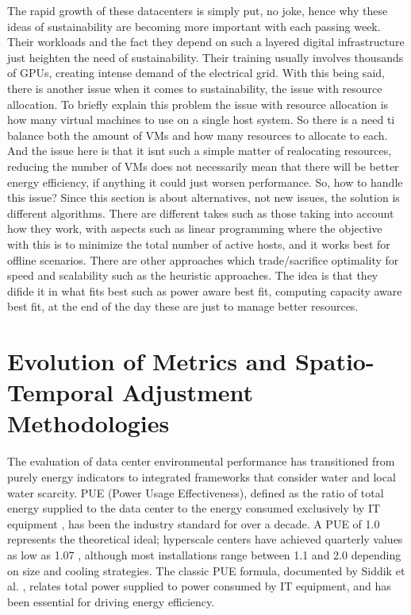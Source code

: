 \documentclass[conference]{IEEEtran}
\begin{document}
The rapid growth of these datacenters is simply put, no joke, hence why these ideas of sustainability are becoming more important with each passing week. Their workloads and the fact they depend on such a layered digital infrastructure just heighten the need of sustainability. Their training usually involves thousands of GPUs, creating intense demand of the electrical grid. With this being said, there is another issue when it comes to sustainability, the issue with resource allocation. To briefly explain this problem the issue with resource allocation is how many virtual machines to use on a single host system. So there is a need ti balance both the amount of VMs and how many resources to allocate to each. And the issue here is that it isnt such a simple matter of realocating resources, reducing the number of VMs does not necessarily mean that there will be  better energy efficiency, if anything it could just worsen performance. So, how to handle this issue? Since this section is about alternatives, not new issues, the solution is different algorithms. There are different takes such as those taking into account how they work, with aspects such as linear programming where the objective with this is to minimize the total number of active hosts, and it works best for offline scenarios. There are other approaches which trade/sacrifice optimality for speed and scalability such as the heuristic approaches. The idea is that they difide it in what fits best such as power aware best fit, computing capacity aware best fit, at the end of the day these are just to manage better resources.

\section{Evolution of Metrics and Spatio-Temporal Adjustment Methodologies}

The evaluation of data center environmental performance has transitioned from purely energy indicators to integrated frameworks that consider water and local water scarcity. PUE (Power Usage Effectiveness), defined as the ratio of total energy supplied to the data center to the energy consumed exclusively by IT equipment \cite{Siddik2021}, has been the industry standard for over a decade. A PUE of 1.0 represents the theoretical ideal; hyperscale centers have achieved quarterly values as low as 1.07 \cite{Pedram2012}, although most installations range between 1.1 and 2.0 depending on size and cooling strategies. The classic PUE formula, documented by Siddik et al. \cite{Siddik2021}, relates total power supplied to power consumed by IT equipment, and has been essential for driving energy efficiency.
\end{document}
